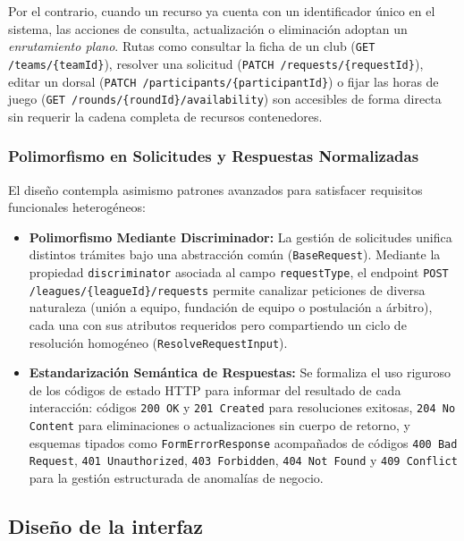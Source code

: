 Por el contrario, cuando un recurso ya cuenta con un identificador único en el sistema, las acciones de consulta, actualización o eliminación adoptan un \textit{enrutamiento plano}. Rutas como consultar la ficha de un club (\texttt{GET /teams/\{teamId\}}), resolver una solicitud (\texttt{PATCH /requests/\{requestId\}}), editar un dorsal (\texttt{PATCH /participants/\{participantId\}}) o fijar las horas de juego (\texttt{GET /rounds/\{roundId\}/availability}) son accesibles de forma directa sin requerir la cadena completa de recursos contenedores.

\subsubsection{Polimorfismo en Solicitudes y Respuestas Normalizadas}
El diseño contempla asimismo patrones avanzados para satisfacer requisitos funcionales heterogéneos:

\begin{itemize}
    \item \textbf{Polimorfismo Mediante Discriminador:} La gestión de solicitudes unifica distintos trámites bajo una abstracción común (\texttt{BaseRequest}). Mediante la propiedad \texttt{discriminator} asociada al campo \texttt{requestType}, el endpoint \texttt{POST /leagues/\{leagueId\}/requests} permite canalizar peticiones de diversa naturaleza (unión a equipo, fundación de equipo o postulación a árbitro), cada una con sus atributos requeridos pero compartiendo un ciclo de resolución homogéneo (\texttt{ResolveRequestInput}).

    \item \textbf{Estandarización Semántica de Respuestas:} Se formaliza el uso riguroso de los códigos de estado HTTP para informar del resultado de cada interacción: códigos \texttt{200 OK} y \texttt{201 Created} para resoluciones exitosas, \texttt{204 No Content} para eliminaciones o actualizaciones sin cuerpo de retorno, y esquemas tipados como \texttt{FormErrorResponse} acompañados de códigos \texttt{400 Bad Request}, \texttt{401 Unauthorized}, \texttt{403 Forbidden}, \texttt{404 Not Found} y \texttt{409 Conflict} para la gestión estructurada de anomalías de negocio.
\end{itemize}

\subsection{Diseño de la interfaz}
\label{sec:interface_design}


